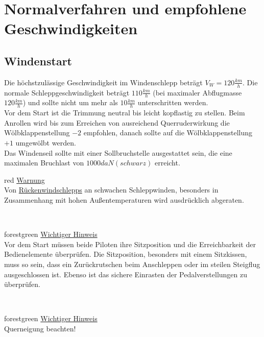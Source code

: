 \section{Normalverfahren und empfohlene Geschwindigkeiten}
\subsection{Windenstart}
Die höchstzulässige Geschwindigkeit im Windenschlepp beträgt $V_W=120 \frac{km}{h}$. Die normale Schleppgeschwindigkeit beträgt $110 \frac{km}{h}$ (bei maximaler Abflugmasse $120 \frac{km}{h}$) und sollte nicht um mehr als $10 \frac{km}{h}$ unterschritten werden.\\
Vor dem Start ist die Trimmung neutral bis leicht kopflastig zu stellen. Beim Anrollen wird bis zum Erreichen von ausreichend Querruderwirkung die Wölbklappenstellung $-2$ empfohlen, danach sollte auf die Wölbklappenstellung $+1$ umgewölbt werden.\\
Das Windenseil sollte mit einer Sollbruchstelle ausgestattet sein, die eine maximalen Bruchlast von $1000 daN (schwarz)$ erreicht. \\
\newline
\begin{color}{red}
\large{\underline{Warnung}}\\
Von \underline{Rückenwindschlepps} an schwachen Schleppwinden, besonders in Zusammenhang mit hohen Außentemperaturen wird ausdrücklich abgeraten.
\end{color}\\
\newline
\begin{color}{forestgreen}
\large{\underline{Wichtiger Hinweis}}\\
Vor dem Start müssen beide Piloten ihre Sitzposition und die Erreichbarkeit der 	Bedienelemente überprüfen. Die Sitzposition, besonders mit einem Sitzkissen, muss so sein, dass ein Zurückrutschen beim Anschleppen oder im steilen Steigflug ausgeschlossen ist. Ebenso ist das sichere Einrasten der Pedalverstellungen zu 	überprüfen.
\end{color}\\
\newline
\begin{color}{forestgreen}
\large{\underline{Wichtiger Hinweis}}\\
Querneigung beachten!
\end{color}\\
